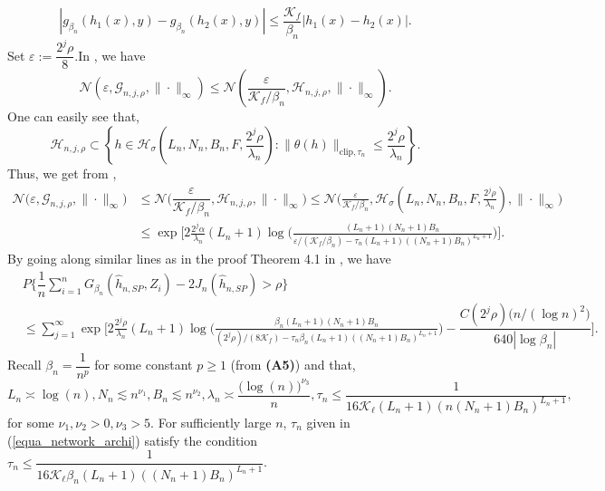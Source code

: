\documentclass[10pt,twoside]{article}
\numberwithin{equation}{section}
\begin{document}
\begin{equation*}
    |g_{\beta_n}(h_1(x), y) - g_{\beta_n}(h_2(x), y)| \leq \dfrac{\mathcal{K}_f}{\beta_n} |h_1(x) - h_2(x)|.
\end{equation*}
%
%
Set $\varepsilon := \dfrac{2^j \rho}{8}$.In \cite{ohn2022nonconvex}, we have  
% 
\begin{equation*} 
\mathcal{N}(\varepsilon, \mathcal{G}_{n, j, \rho}, \| \cdot \|_\infty) \leq \mathcal{N} (\frac{\varepsilon}{\mathcal{K}_f/\beta_n}, \mathcal{H}_{n, j, \rho}, \| \cdot \|_\infty).
\end{equation*} 
%
% 
One can easily see that,
%
\begin{equation*} 
 \mathcal{H}_{n, j, \rho}  \subset \left\{  h \in \mathcal{H}_{\sigma}(L_{n}, N_{n}, B_{n}, F, \dfrac{2^j \rho}{\lambda_n}): \| \theta(h) \|_{ \text{clip}, \tau_n} \leq \frac{2^j \rho}{\lambda_n}  \right\}. 
 \end{equation*}
%
Thus, we get from \cite{ohn2022nonconvex}, 
%
\begin{align*} 
\mathcal{N} \Big(\varepsilon, \mathcal{G}_{n, j, \rho}, \| \cdot \|_\infty\Big)  \nonumber & \leq \mathcal{N}\Bigg(\dfrac{\varepsilon}{\mathcal{K}_f/\beta_n}, \mathcal{H}_{n, j, \rho}, \| \cdot \|_\infty \Bigg)  \leq \mathcal{N}\Bigg(\frac{\varepsilon}{\mathcal{K}_f/\beta_n}, \mathcal{H}_{\sigma}(L_{n},N_{n}, B_{n}, F, \frac{2^j \rho}{\lambda_n}),  \| \cdot \|_\infty \Bigg)
\\
& \leq  \exp\Bigg[2 \frac{2^j \alpha}{\lambda_n}(L_n + 1) \log \Bigg(\frac{(L_n + 1)(N_n + 1)B_n}{\varepsilon/(\mathcal{K}_f/\beta_n) - \tau_n (L_n + 1)((N_n + 1) B_n)^{L_n +1}} \Bigg) \Bigg].
\end{align*} 
%
By going along similar lines as in the proof Theorem 4.1 in \cite{kengne2025deep}, we have
%
\begin{align}
\nonumber & P\Bigg\{\dfrac{1}{n} \sum_{i=1}^n  G_{\beta_n}(\widehat{h}_{n,SP}, Z_i) -2J_n(\widehat{h}_{n,SP}) > \rho \Bigg\}  
\\
\nonumber & \leq  \sum _{j = 1}^{\infty} \exp\Bigg[2 \frac{2^j \rho}{\lambda_n}(L_n + 1) \log \Big(\frac{\beta_n (L_n + 1)(N_n + 1)B_n}{(2^j\rho)/(8\mathcal{K}_f) - \tau_n \beta_n (L_n + 1)((N_n + 1) B_n)^{L_n +1}} \Big) - \dfrac{C(2^ j \rho) \big(n/(\log n)^2 \big)}{640|\log \beta_n|} \Bigg].
\end{align}
%
Recall $\beta_n = \dfrac{1}{n^p}$ for some constant $p \ge 1$ (from \textbf{(A5)}) and that,
%
\begin{equation}\label{equa_network_archi}
 L_n \asymp \log(n), N_n \lesssim n^{\nu_1}, B_n \lesssim n^{\nu_2}, \lambda_n \asymp \frac{\big( \log(n) \big)^{\nu_3}}{n}, \tau_n \leq \dfrac{1}{16 \mathcal{K}_{\ell}(L_n + 1)(n(N_n + 1)B_n)^{L_n + 1} },  
\end{equation}
%
for some $\nu_1, \nu_2 >0, \nu_3 > 5$.
For sufficiently large $n$, $\tau_n$ given in (\ref{equa_network_archi}) satisfy the condition \\
$\tau_n \leq \dfrac{1}{16 \mathcal{K}_{\ell} \beta_n(L_n + 1)((N_n + 1)B_n)^{L_n + 1} }$.
\end{document}
